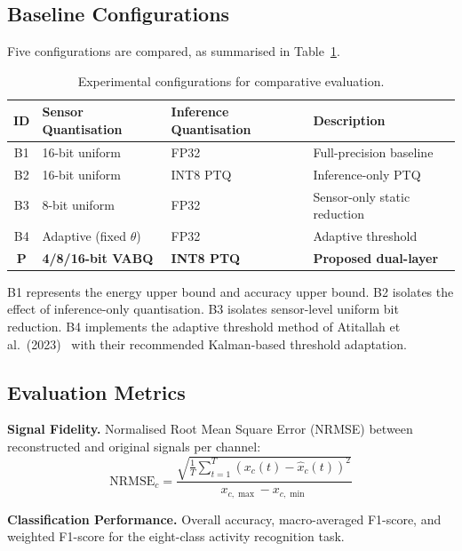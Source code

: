 \subsection{Baseline Configurations}
\label{sec:exp_baselines}

Five configurations are compared, as summarised in Table~\ref{tab:baselines}.

\begin{table}[H]
\centering
\caption{Experimental configurations for comparative evaluation.}
\label{tab:baselines}
\begin{tabular}{@{}clll@{}}
\toprule
\textbf{ID} & \textbf{Sensor Quantisation} & \textbf{Inference Quantisation} & \textbf{Description} \\
\midrule
B1 & 16-bit uniform & FP32 & Full-precision baseline \\
B2 & 16-bit uniform & INT8 PTQ & Inference-only PTQ~\cite{smoothquant2024} \\
B3 & 8-bit uniform & FP32 & Sensor-only static reduction \\
B4 & Adaptive (fixed $\theta$) & FP32 & Adaptive threshold~\cite{atitallah2023autonomous} \\
\textbf{P} & \textbf{4/8/16-bit VABQ} & \textbf{INT8 PTQ} & \textbf{Proposed dual-layer} \\
\bottomrule
\end{tabular}
\end{table}

B1 represents the energy upper bound and accuracy upper bound. B2 isolates the effect of inference-only quantisation. B3 isolates sensor-level uniform bit reduction. B4 implements the adaptive threshold method of Atitallah et al.~(2023)~\cite{atitallah2023autonomous} with their recommended Kalman-based threshold adaptation.

\subsection{Evaluation Metrics}
\label{sec:exp_metrics}

\textbf{Signal Fidelity.} Normalised Root Mean Square Error (NRMSE) between reconstructed and original signals per channel:
\begin{equation}
    \text{NRMSE}_c = \frac{\sqrt{\frac{1}{T}\sum_{t=1}^{T}(x_c(t) - \hat{x}_c(t))^2}}{x_{c,\max} - x_{c,\min}}
    \label{eq:nrmse}
\end{equation}

\textbf{Classification Performance.} Overall accuracy, macro-averaged F1-score, and weighted F1-score for the eight-class activity recognition task.

